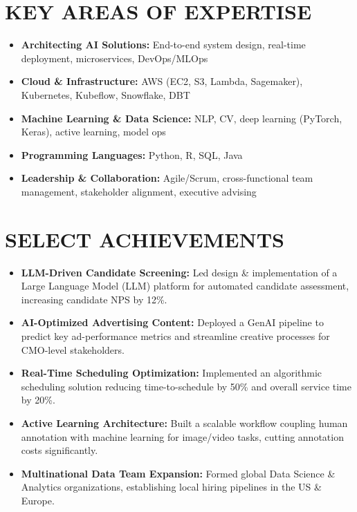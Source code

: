 \documentclass[11pt]{article}
\begin{document}
\section*{KEY AREAS OF EXPERTISE}
\begin{itemize}[leftmargin=*]
  \item \textbf{Architecting AI Solutions:} End-to-end system design, real-time deployment, microservices, DevOps/MLOps
  \item \textbf{Cloud \& Infrastructure:} AWS (EC2, S3, Lambda, Sagemaker), Kubernetes, Kubeflow, Snowflake, DBT
  \item \textbf{Machine Learning \& Data Science:} NLP, CV, deep learning (PyTorch, Keras), active learning, model ops
  \item \textbf{Programming Languages:} Python, R, SQL, Java
  \item \textbf{Leadership \& Collaboration:} Agile/Scrum, cross-functional team management, stakeholder alignment, executive advising
\end{itemize}

\section*{SELECT ACHIEVEMENTS}
\begin{itemize}[leftmargin=*]
  \item \textbf{LLM-Driven Candidate Screening:} Led design \& implementation of a Large Language Model (LLM) platform for automated candidate assessment, increasing candidate NPS by 12\%.
  \item \textbf{AI-Optimized Advertising Content:} Deployed a GenAI pipeline to predict key ad-performance metrics and streamline creative processes for CMO-level stakeholders.
  \item \textbf{Real-Time Scheduling Optimization:} Implemented an algorithmic scheduling solution reducing time-to-schedule by 50\% and overall service time by 20\%.
  \item \textbf{Active Learning Architecture:} Built a scalable workflow coupling human annotation with machine learning for image/video tasks, cutting annotation costs significantly.
  \item \textbf{Multinational Data Team Expansion:} Formed global Data Science \& Analytics organizations, establishing local hiring pipelines in the US \& Europe.
\end{itemize}
\end{document}
